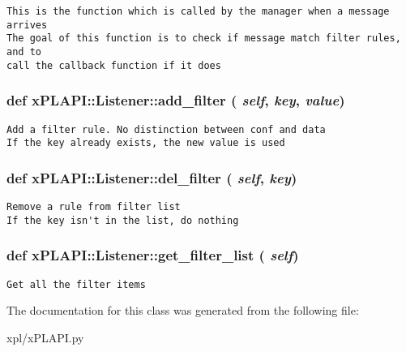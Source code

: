 \footnotesize\begin{verbatim}
This is the function which is called by the manager when a message arrives
The goal of this function is to check if message match filter rules, and to
call the callback function if it does
\end{verbatim}
\normalsize
 \hypertarget{classxPLAPI_1_1Listener_ff3b74767e27828d084af4d34e3fd20e}{
\subsubsection[add\_\-filter]{\setlength{\rightskip}{0pt plus 5cm}def xPLAPI::Listener::add\_\-filter ( {\em self}, \/   {\em key}, \/   {\em value})}}
\label{classxPLAPI_1_1Listener_ff3b74767e27828d084af4d34e3fd20e}




\footnotesize\begin{verbatim}
Add a filter rule. No distinction between conf and data
If the key already exists, the new value is used
\end{verbatim}
\normalsize
 \hypertarget{classxPLAPI_1_1Listener_babc7a4d6a30876fda2fc593942069b0}{
\subsubsection[del\_\-filter]{\setlength{\rightskip}{0pt plus 5cm}def xPLAPI::Listener::del\_\-filter ( {\em self}, \/   {\em key})}}
\label{classxPLAPI_1_1Listener_babc7a4d6a30876fda2fc593942069b0}




\footnotesize\begin{verbatim}
Remove a rule from filter list
If the key isn't in the list, do nothing
\end{verbatim}
\normalsize
 \hypertarget{classxPLAPI_1_1Listener_e719472458dd324763b91364a3991df1}{
\subsubsection[get\_\-filter\_\-list]{\setlength{\rightskip}{0pt plus 5cm}def xPLAPI::Listener::get\_\-filter\_\-list ( {\em self})}}
\label{classxPLAPI_1_1Listener_e719472458dd324763b91364a3991df1}




\footnotesize\begin{verbatim}
Get all the filter items
\end{verbatim}
\normalsize
 

The documentation for this class was generated from the following file:\begin{CompactItemize}
\item 
xpl/xPLAPI.py\end{CompactItemize}

